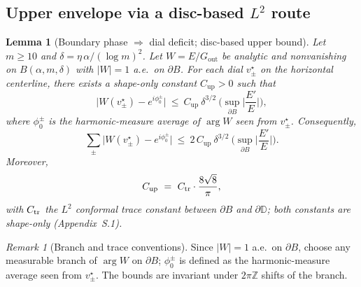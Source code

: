 \documentclass[11pt]{article}
\numberwithin{equation}{section}
\newtheorem{lemma}[theorem]{Lemma}
\theoremstyle{remark}
\newtheorem{remark}[theorem]{Remark}
\newcommand{\D}{\mathbb{D}}
\newcommand{\Gout}{G_{\mathrm{out}}}
\begin{document}
\subsection{Upper envelope via a disc-based $L^2$ route}\label{subsec:upper}

\begin{lemma}[Boundary phase $\Rightarrow$ dial deficit; disc-based upper bound]\label{lem:upper-disc}
Let $m\ge 10$ and $\delta=\eta\,\alpha/(\log m)^2$. Let $W=E/\Gout$ be analytic and nonvanishing on $B(\alpha,m,\delta)$ with $|W|=1$ a.e.\ on $\partial B$. For each dial $v_\pm^\star$ on the horizontal centerline, there exists a shape-only constant $C_{\mathrm{up}}>0$ such that
\begin{equation}\label{eq:upper-disc-point}
\big|W(v_\pm^\star)-e^{i\phi_0^\pm}\big|
\ \le\ C_{\mathrm{up}}\ \delta^{3/2}\ \Big(\sup_{\partial B}\Big|\frac{E'}{E}\Big|\Big),
\end{equation}
where $\phi_0^\pm$ is the harmonic-measure average of $\arg W$ seen from $v_\pm^\star$. Consequently,
\begin{equation}\label{eq:Uhm-upper-disc}
\sum_{\pm}\big|W(v_\pm^\star)-e^{i\phi_0^\pm}\big|
\ \le\ 2\,C_{\mathrm{up}}\ \delta^{3/2}\ \Big(\sup_{\partial B}\Big|\frac{E'}{E}\Big|\Big).
\end{equation}
Moreover,
\begin{equation}\label{eq:Cup-def}
C_{\mathrm{up}}\ =\ C_{\rm tr}\cdot \frac{8\sqrt{8}}{\pi},
\end{equation}
with $C_{\rm tr}$ the $L^2$ conformal trace constant between $\partial B$ and $\partial\D$; both constants are \emph{shape-only} (Appendix~S.1).
\end{lemma}

\begin{remark}[Branch and trace conventions]
Since $|W|=1$ a.e.\ on $\partial B$, choose any measurable branch of $\arg W$ on $\partial B$; $\phi_0^\pm$ is defined as the harmonic-measure average seen from $v_\pm^\star$. The bounds are invariant under $2\pi\mathbb Z$ shifts of the branch.
\end{remark}
\end{document}
